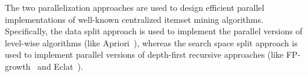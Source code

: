 \documentclass[preprint,review,12pt]{elsarticle}
\begin{document}
The two parallelization approaches are used to design efficient parallel implementations of well-known centralized itemset mining algorithms.  Specifically, the data split approach is used to implement the parallel versions of level-wise algorithms (like Apriori~\cite{apriori}), whereas the search space split approach is used to implement parallel versions of depth-first recursive approaches (like FP-growth~\cite{Han00} and Eclat~\cite{Zaki97newalgorithms}). 




%
%
%
\end{document}
